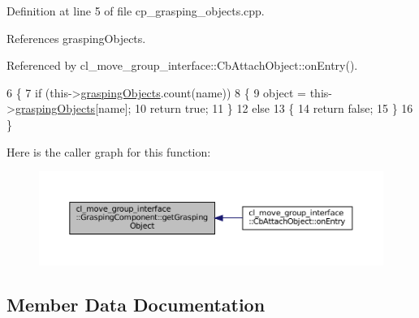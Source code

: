 Definition at line 5 of file cp\+\_\+grasping\+\_\+objects.\+cpp.



References grasping\+Objects.



Referenced by cl\+\_\+move\+\_\+group\+\_\+interface\+::\+Cb\+Attach\+Object\+::on\+Entry().


\begin{DoxyCode}
6    \{
7       \textcolor{keywordflow}{if} (this->\hyperlink{classcl__move__group__interface_1_1GraspingComponent_a5e0364a3b76738fb263b11c4e1ef56cc}{graspingObjects}.count(name))
8       \{
9          \textcolor{keywordtype}{object} = this->\hyperlink{classcl__move__group__interface_1_1GraspingComponent_a5e0364a3b76738fb263b11c4e1ef56cc}{graspingObjects}[name];
10          \textcolor{keywordflow}{return} \textcolor{keyword}{true};
11       \}
12       \textcolor{keywordflow}{else}
13       \{
14          \textcolor{keywordflow}{return} \textcolor{keyword}{false};
15       \}
16    \}
\end{DoxyCode}
Here is the caller graph for this function\+:
\nopagebreak
\begin{figure}[H]
\begin{center}
\leavevmode
\includegraphics[width=350pt]{classcl__move__group__interface_1_1GraspingComponent_a283b379a7b7ad91c69ee94a057730165_icgraph}
\end{center}
\end{figure}


\subsection{Member Data Documentation}
\mbox{\label{classcl__move__group__interface_1_1GraspingComponent_a486b5c831dc81ae0bf909b585ba7c615}} 
